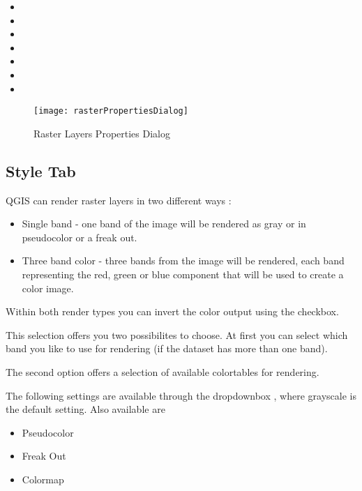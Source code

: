 \begin{itemize}[label=--]
 \item {}
 \item {}
 \item {}
 \item {}
 \item {}
 \item {}
 \item {}
\end{itemize}

\begin{figure}[h]
  \centering
   \texttt{[image: rasterPropertiesDialog]}
   \caption{Raster Layers Properties Dialog \nixcaption}\label{fig:raster_properties}
\end{figure}

\subsection{Style Tab}\label{label_sombology}

QGIS can render raster layers in two different ways :

\begin{itemize}[label=--]
\item Single band - one band of the image will be rendered as gray or in
pseudocolor or a freak out.
\item Three band color - three bands from the image will be rendered, each
band representing the red, green or blue component that will be used to create
a color image.
\end{itemize}

Within both render types you can invert the color output using the
 checkbox.


This selection offers you two possibilites to choose. At first you can
select which band you like to use for rendering (if the dataset has more than
one band).

The second option offers a selection of available colortables for rendering.

The following settings are available through the dropdownbox
, where grayscale is the default
setting.
Also available are
\begin{itemize}[label=--]
\item Pseudocolor
\item Freak Out
\item Colormap
\end{itemize}

